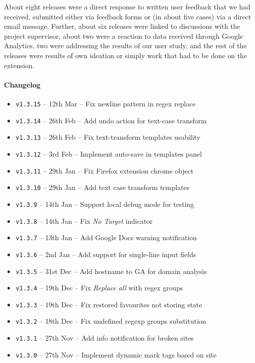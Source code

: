 \documentclass[bsc,frontabs,twoside,singlespacing,parskip,deptreport]{infthesis}
\providecommand{\tightlist}{%
  \setlength{\itemsep}{0pt}\setlength{\parskip}{0pt}}
\begin{document}
About eight releases were a direct response to written user feedback that we had received, submitted either via feedback forms or (in about five cases) via a direct email message. Further, about six releases were linked to discussions with the project supervisor, about two were a reaction to data received through Google Analytics, two were addressing the results of our user study, and the rest of the releases were results of own ideation or simply work that had to be done on the extension.

\paragraph*{Changelog}
\begin{itemize}
\tightlist
\item
\texttt{v1.3.15} -- 12th Mar -- Fix newline pattern in regex replace
\item
\texttt{v1.3.14} -- 26th Feb -- Add undo action for text-case transform
\item
\texttt{v1.3.13} -- 26th Feb -- Fix text-transform templates usability
\item
\texttt{v1.3.12} -- 3rd Feb -- Implement auto-save in templates panel
\item
\texttt{v1.3.11} -- 29th Jan -- Fix Firefox extension chrome object
\item
\texttt{v1.3.10} -- 29th Jan -- Add text case transform templates
\item
\texttt{v1.3.9} -- 14th Jan -- Support local debug mode for testing
\item
\texttt{v1.3.8} -- 14th Jan -- Fix \textit{No Target} indicator
\item
\texttt{v1.3.7} -- 13th Jan -- Add Google Docs warning notification
\item
\texttt{v1.3.6} -- 2nd Jan -- Add support for single-line input fields
\item
\texttt{v1.3.5} -- 31st Dec -- Add hostname to GA for domain analysis
\item
\texttt{v1.3.4} -- 19th Dec -- Fix \textit{Replace all} with regex groups
\item
\texttt{v1.3.3} -- 19th Dec -- Fix restored favourites not storing state
\item
\texttt{v1.3.2} -- 18th Dec -- Fix undefined regexp groups substitution
\item
\texttt{v1.3.1} -- 27th Nov -- Add info notification for broken sites
\item
\texttt{v1.3.0} -- 27th Nov -- Implement dynamic mark tags based on site

\end{itemize}
\end{document}
